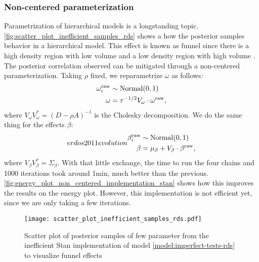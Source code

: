 \subsubsection*{Non-centered parameterization}

Parametrization of hierarchical models is a longstanding topic.
\autoref{fig:scatter_plot_inefficient_samples_rds} shows a how the posterior
samples behavior in a hierarchical model. This effect is known as funnel since
there is a high density region with low volume and a low density region with
high volume \cite[p. 1]{betancourt2015hamiltonian}. The posterior correlation
observed can be mitigated through a non-centered parameterization. Taking
$\rho$ fixed, we reparametrize $\omega$ as follows: 
\begin{equation*}
  \begin{split}
    \omega^{\mathrm{raw}}_i &\sim \operatorname{Normal}(0,1) \\
    \omega &= \tau^{-1/2}V_{\omega} \cdot \omega^{\mathrm{raw}},
  \end{split}
\end{equation*}
where $V_{\omega}V_{\omega}^{*} = (D - \rho A)^{-1}$ is the Cholesky decomposition. We do the
same thing for the effects $\beta$: 
\begin{equation*}erdos2011evolution
  \begin{split}
    \beta^{\mathrm{raw}}_i &\sim \operatorname{Normal}(0,1) \\
    \beta &= \mu_{\beta} + V_{\beta} \cdot \beta^{\mathrm{raw}},
  \end{split}
\end{equation*}
where $V_{\beta}V_{\beta}^{*} = \Sigma_{\beta}$. With that little exchange,
the time to run the four chains and 1000 iterations took around 1min, much
better than the previous.
\autoref{fig:energy_plot_non_centered_implementation_stan} shows how this
improves the results on the energy plot. However, this implementation is not
efficient yet, since we are only taking a few iterations. 

\begin{figure}[htb]
  \centering
  \caption{\label{fig:scatter_plot_inefficient_samples_rds}Scatter plot 
  of posterior samples of few parameter from the inefficient Stan implementation of model
  \eqref{model:imperfect-tests-rds} to visualize funnel effects}
  \texttt{[image: scatter\_plot\_inefficient\_samples\_rds.pdf]}
\end{figure}

